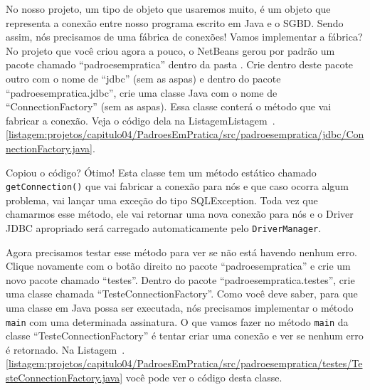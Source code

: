 No nosso projeto, um tipo de objeto que usaremos muito, é um objeto que representa a conexão entre nosso programa escrito em Java e o SGBD. Sendo assim, nós precisamos de uma fábrica de conexões! Vamos implementar a fábrica? No projeto que você criou agora a pouco, o NetBeans gerou por padrão um pacote chamado ``padroesempratica'' dentro da pasta . Crie dentro deste pacote outro com o nome de ``jdbc'' (sem as aspas) e dentro do pacote ``padroesempratica.jdbc'', crie uma classe Java com o nome de ``ConnectionFactory'' (sem as aspas). Essa classe conterá o método que vai fabricar a conexão. Veja o código dela na ListagemListagem~\thechapter.\ref{listagem:projetos/capitulo04/PadroesEmPratica/src/padroesempratica/jdbc/ConnectionFactory.java}.


Copiou o código? Ótimo! Esta classe tem um método estático chamado \texttt{getConnection()} que vai fabricar a conexão para nós e que caso ocorra algum problema, vai lançar uma exceção do tipo SQLException. Toda vez que chamarmos esse método, ele vai retornar uma nova conexão para nós e o Driver JDBC apropriado será carregado automaticamente pelo \texttt{DriverManager}. 

Agora precisamos testar esse método para ver se não está havendo nenhum erro. Clique novamente com o botão direito no pacote ``padroesempratica'' e crie um novo pacote chamado ``testes''. Dentro do pacote ``padroesempratica.testes'', crie uma classe chamada ``TesteConnectionFactory''. Como você deve saber, para que uma classe em Java possa ser executada, nós precisamos implementar o método \texttt{main} com uma determinada assinatura. O que vamos fazer no método \texttt{main} da classe ``TesteConnectionFactory'' é tentar criar uma conexão e ver se nenhum erro é retornado. Na Listagem~\thechapter.\ref{listagem:projetos/capitulo04/PadroesEmPratica/src/padroesempratica/testes/TesteConnectionFactory.java} você pode ver o código desta classe.


